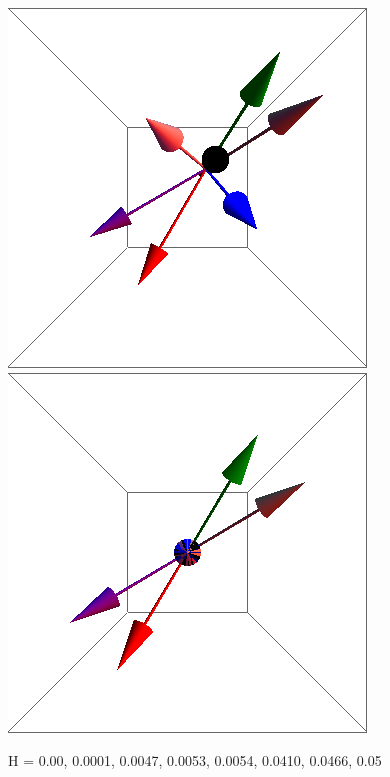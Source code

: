 \documentclass{article}
\begin{document}
\begin{figure}[ht]
\includegraphics[scale=0.27]{100/467S000to005R.png}
\includegraphics[scale=0.27]{100/501S000to005R.png}
\caption{H = 0.00, 0.0001, 0.0047, 0.0053, 0.0054, 0.0410, 0.0466, 0.05}
\end{figure}
\clearpage
\end{document}
